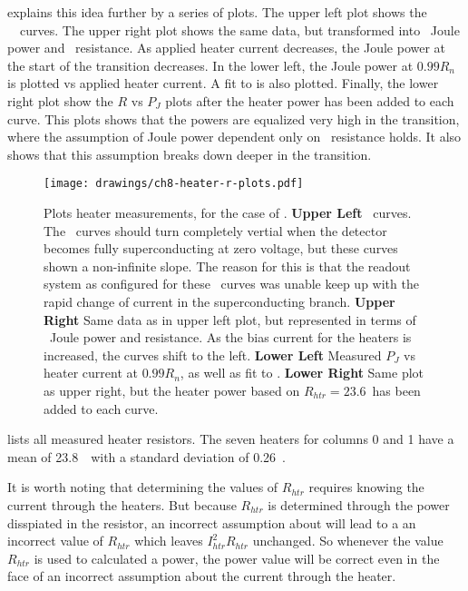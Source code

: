 explains this idea further by a series of plots.
The upper left plot shows the \TES\ \IV\ curves.
The upper right plot shows the same data, but transformed into \TES\ Joule power and \TES\ resistance.
As applied heater current decreases, the Joule power at the start of the transition decreases.
In the lower left, the Joule power at $0.99R_{n}$ is plotted vs applied heater current.
A fit to  is also plotted.
Finally, the lower right plot show the $R$ vs $P_J$ plots after the heater power has been added to each curve.
This plots shows that the powers are equalized very high in the transition, where the assumption of Joule power dependent only on \TES\ resistance holds.
It also shows that this assumption breaks down deeper in the transition.

\begin{figure*}
\texttt{[image: drawings/ch8-heater-r-plots.pdf]}
\caption{Plots heater measurements, for the case of .
\textbf{Upper Left} \IV\ curves. The \IV\ curves should turn completely vertial when the detector becomes fully superconducting at zero voltage, but these curves shown a non-infinite slope. The reason for this is that the readout system as configured for these \IV\ curves was unable keep up with the rapid change of current in the superconducting branch.
\textbf{Upper Right} Same data as in upper left plot, but represented in terms of \TES\ Joule power and resistance. As the bias current for the heaters is increased, the curves shift to the left.
\textbf{Lower Left} Measured $P_{J}$ vs heater current at $0.99R_n$, as well as fit to .
\textbf{Lower Right} Same plot as upper right, but the heater power based on $R_{htr} = 23.6$~\Ohm has been added to each curve.}
\label{fig:heater-r-plots}
\end{figure*}

 lists all measured heater resistors.
The seven heaters for columns 0 and 1 have a mean of 23.8~\Ohm\ with a standard deviation of 0.26~\Ohm.

It is worth noting that determining the values of $R_{htr}$ requires knowing the current through the heaters.
But because $R_{htr}$ is determined through the power disspiated in the resistor, an incorrect assumption about will lead to a an incorrect value of $R_{htr}$ which leaves $I_{htr}^2 R_{htr}$ unchanged.
So whenever the value $R_{htr}$ is used to calculated a power, the power value will be correct even in the face of an incorrect assumption about the current through the heater.

